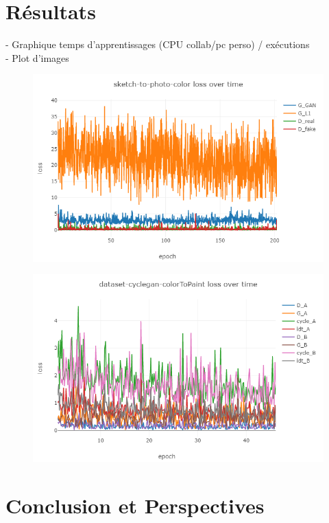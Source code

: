 \documentclass[a4paper, 12pt]{report}
\begin{document}
\chapter{Résultats}
- Graphique temps d'apprentissages (CPU collab/pc perso) / exécutions\\
- Plot d'images

\begin{figure}[!h]
\centering
\includegraphics[scale=0.5]{images/plot-pix2pix.png}
\end{figure}

\begin{figure}[!h]
\centering
\includegraphics[scale=0.5]{images/plot-cyclegan.png}
\end{figure}

\chapter{Conclusion et Perspectives\label{chap-conclusion}}
\end{document}
